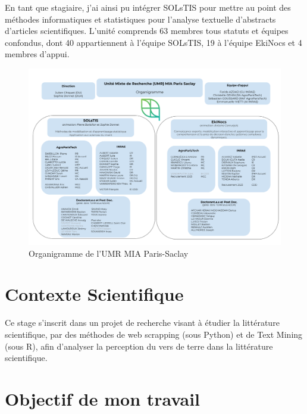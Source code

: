 \documentclass{book}
\begin{document}
En tant que stagiaire, j'ai ainsi pu intégrer SOLsTIS pour mettre au point des
méthodes informatiques et statistiques pour l'analyse textuelle d'abstracts
d'articles scientifiques. L'unité comprends 63 membres tous statuts et équipes
confondus, dont 40 appartiennent à l'équipe SOLsTIS, 19 à l'équipe EkiNocs et 4
membres d'appui.

\lipsum[1-4]

\begin{figure}[h] %
    \begin{center} %
        \includegraphics[width=16cm]{organigrammeEquipe.png}
        \caption{Organigramme de l'UMR MIA Paris-Saclay}
    \end{center}
\end{figure}

\lipsum[1-2]

\thispagestyle{fancy}

\section{Contexte Scientifique}

\noindent
Ce stage s'inscrit dans un projet de recherche visant à étudier la littérature
scientifique, par des méthodes de web scrapping (sous Python) et de Text Mining
(sous R), afin d'analyser la perception du vers de terre dans la littérature
scientifique.

\lipsum[1-4]

\section{Objectif de mon travail}
\end{document}
